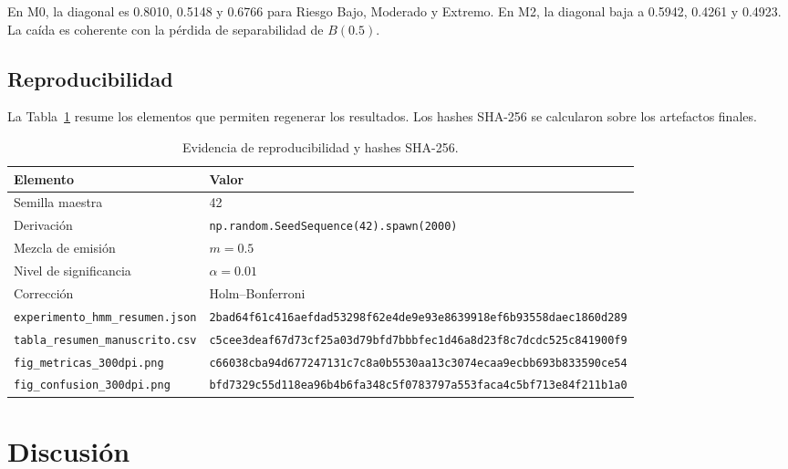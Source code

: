 \documentclass[11pt,letterpaper]{article}
\begin{document}
En M0, la diagonal es 0.8010, 0.5148 y 0.6766 para Riesgo Bajo, Moderado y Extremo. En M2, la diagonal baja a 0.5942, 0.4261 y 0.4923. La caída es coherente con la pérdida de separabilidad de \(B(0.5)\).

\subsection{Reproducibilidad}

La Tabla~\ref{tab:repro} resume los elementos que permiten regenerar los resultados. Los hashes SHA-256 se calcularon sobre los artefactos finales.

\begin{table}[H]
\centering
\caption{Evidencia de reproducibilidad y hashes SHA-256.}
\label{tab:repro}
\scriptsize
\begin{tabular}{@{}p{4.4cm}p{11.0cm}@{}}
\toprule
Elemento & Valor\\
\midrule
Semilla maestra & 42\\
Derivación & \texttt{np.random.SeedSequence(42).}\newline\texttt{spawn(2000)}\\
Mezcla de emisión & \(m=0.5\)\\
Nivel de significancia & \(\alpha=0.01\)\\
Corrección & Holm--Bonferroni\\
\texttt{experimento\_hmm\_resumen.json} & \texttt{2bad64f61c416aefdad53298f62e4de9}\newline\texttt{e93e8639918ef6b93558daec1860d289}\\
\texttt{tabla\_resumen\_manuscrito.csv} & \texttt{c5cee3deaf67d73cf25a03d79bfd7bbb}\newline\texttt{fec1d46a8d23f8c7dcdc525c841900f9}\\
\texttt{fig\_metricas\_300dpi.png} & \texttt{c66038cba94d677247131c7c8a0b5530}\newline\texttt{aa13c3074ecaa9ecbb693b833590ce54}\\
\texttt{fig\_confusion\_300dpi.png} & \texttt{bfd7329c55d118ea96b4b6fa348c5f07}\newline\texttt{83797a553faca4c5bf713e84f211b1a0}\\
\bottomrule
\end{tabular}
\end{table}

\section{Discusión}
\end{document}
